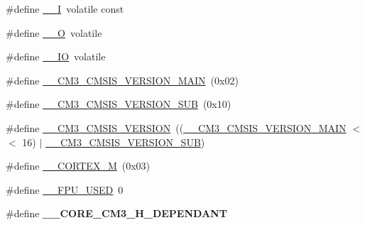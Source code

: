 \begin{DoxyCompactItemize}
\item 
\#define \hyperlink{group___c_m_s_i_s__core__definitions_gaf63697ed9952cc71e1225efe205f6cd3}{\-\_\-\-\_\-\-I}~volatile const
\item 
\#define \hyperlink{group___c_m_s_i_s__core__definitions_ga7e25d9380f9ef903923964322e71f2f6}{\-\_\-\-\_\-\-O}~volatile
\item 
\#define \hyperlink{group___c_m_s_i_s__core__definitions_gaec43007d9998a0a0e01faede4133d6be}{\-\_\-\-\_\-\-I\-O}~volatile
\item 
\#define \hyperlink{group___c_m_s_i_s__core__definitions_gac1c1120e9fe082fac8225c60143ac79a}{\-\_\-\-\_\-\-C\-M3\-\_\-\-C\-M\-S\-I\-S\-\_\-\-V\-E\-R\-S\-I\-O\-N\-\_\-\-M\-A\-I\-N}~(0x02)
\item 
\#define \hyperlink{group___c_m_s_i_s__core__definitions_ga9ff7a998d4b8b3c87bfaca6e78607950}{\-\_\-\-\_\-\-C\-M3\-\_\-\-C\-M\-S\-I\-S\-\_\-\-V\-E\-R\-S\-I\-O\-N\-\_\-\-S\-U\-B}~(0x10)
\item 
\#define \hyperlink{group___c_m_s_i_s__core__definitions_gaf888c651cd8c93fd25364f9e74306a1c}{\-\_\-\-\_\-\-C\-M3\-\_\-\-C\-M\-S\-I\-S\-\_\-\-V\-E\-R\-S\-I\-O\-N}~((\hyperlink{group___c_m_s_i_s__core__definitions_gac1c1120e9fe082fac8225c60143ac79a}{\-\_\-\-\_\-\-C\-M3\-\_\-\-C\-M\-S\-I\-S\-\_\-\-V\-E\-R\-S\-I\-O\-N\-\_\-\-M\-A\-I\-N} $<$$<$ 16) $|$ \hyperlink{group___c_m_s_i_s__core__definitions_ga9ff7a998d4b8b3c87bfaca6e78607950}{\-\_\-\-\_\-\-C\-M3\-\_\-\-C\-M\-S\-I\-S\-\_\-\-V\-E\-R\-S\-I\-O\-N\-\_\-\-S\-U\-B})
\item 
\#define \hyperlink{group___c_m_s_i_s__core__definitions_ga63ea62503c88acab19fcf3d5743009e3}{\-\_\-\-\_\-\-C\-O\-R\-T\-E\-X\-\_\-\-M}~(0x03)
\item 
\#define \hyperlink{group___c_m_s_i_s__core__definitions_gaa167d0f532a7c2b2e3a6395db2fa0776}{\-\_\-\-\_\-\-F\-P\-U\-\_\-\-U\-S\-E\-D}~0
\item 
\hypertarget{group___c_m_s_i_s__core__definitions_ga8fbb068b8003976152cf1d6197778e95}{\#define {\bfseries \-\_\-\-\_\-\-C\-O\-R\-E\-\_\-\-C\-M3\-\_\-\-H\-\_\-\-D\-E\-P\-E\-N\-D\-A\-N\-T}}\label{group___c_m_s_i_s__core__definitions_ga8fbb068b8003976152cf1d6197778e95}


\end{DoxyCompactItemize}
